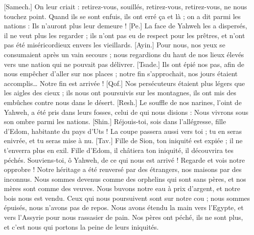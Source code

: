 \begin{multicols}{2}
[Samech.] On leur criait : retirez-vous, souillés, retirez-vous, retirez-vous, ne nous touchez point. Quand ils se sont enfuis, ils ont erré ça et là ; on a dit parmi les nations : Ils n'auront plus leur demeure !
[Pe.] La face de Yahweh les a dispersés, il ne veut plus les regarder ; ils n'ont pas eu de respect pour les prêtres, et n'ont pas été miséricordieux envers les vieillards.
[Ayin.] Pour nous, nos yeux se consumaient après un vain secours ; nous regardions du haut de nos lieux élevés vers une nation qui ne pouvait pas délivrer.
[Tsade.] Ils ont épié nos pas, afin de nous empêcher d'aller sur nos places ; notre fin s'approchait, nos jours étaient accomplis… Notre fin est arrivée !
[Qof.] Nos persécuteurs étaient plus légers que les aigles des cieux ; ils nous ont poursuivis sur les montagnes, ils ont mis des embûches contre nous dans le désert.
[Resh.] Le souffle de nos narines, l'oint de Yahweh, a été pris dans leurs fosses, celui de qui nous disions : Nous vivrons sous son ombre parmi les nations.
[Shin.] Réjouis-toi, sois dans l'allégresse, fille d'Edom, habitante du pays d'Uts ! La coupe passera aussi vers toi ; tu en seras enivrée, et tu seras mise à nu.
[Tav.] Fille de Sion, ton iniquité est expiée ; il ne t'enverra plus en exil. Fille d'Edom, il châtiera ton iniquité, il découvrira tes péchés.
\VerseOne{}Souviens-toi, ô Yahweh, de ce qui nous est arrivé ! Regarde et vois notre opprobre !
Notre héritage a été renversé par des étrangers, nos maisons par des inconnus.
Nous sommes devenus comme des orphelins qui sont sans pères, et nos mères sont comme des veuves.
Nous buvons notre eau à prix d'argent, et notre bois nous est vendu.
Ceux qui nous poursuivent sont sur notre cou ; nous sommes épuisés, nous n'avons pas de repos.
Nous avons étendu la main vers l'Egypte, et vers l'Assyrie pour nous rassasier de pain.
Nos pères ont péché, ils ne sont plus, et c'est nous qui portons la peine de leurs iniquités.

\end{multicols}
